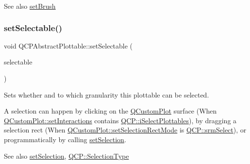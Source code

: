 \begin{DoxySeeAlso}{See also}
\hyperlink{class_q_c_p_abstract_plottable_a7a4b92144dca6453a1f0f210e27edc74}{set\+Brush} 
\end{DoxySeeAlso}
\mbox{\label{class_q_c_p_abstract_plottable_ac238d6e910f976f1f30d41c2bca44ac3}} 
\subsubsection{\texorpdfstring{set\+Selectable()}{setSelectable()}}
{\footnotesize\ttfamily void Q\+C\+P\+Abstract\+Plottable\+::set\+Selectable (\begin{DoxyParamCaption}\item[{\hyperlink{namespace_q_c_p_ac6cb9db26a564b27feda362a438db038}{Q\+C\+P\+::\+Selection\+Type}}]{selectable }\end{DoxyParamCaption})}

Sets whether and to which granularity this plottable can be selected.

A selection can happen by clicking on the \hyperlink{class_q_custom_plot}{Q\+Custom\+Plot} surface (When \hyperlink{class_q_custom_plot_a5ee1e2f6ae27419deca53e75907c27e5}{Q\+Custom\+Plot\+::set\+Interactions} contains \hyperlink{namespace_q_c_p_a2ad6bb6281c7c2d593d4277b44c2b037ab4ac8dbba56ed6ef7d1355895707d6a5}{Q\+C\+P\+::i\+Select\+Plottables}), by dragging a selection rect (When \hyperlink{class_q_custom_plot_a810ef958ebe84db661c7288b526c0deb}{Q\+Custom\+Plot\+::set\+Selection\+Rect\+Mode} is \hyperlink{namespace_q_c_p_ac9aa4d6d81ac76b094f9af9ad2d3aacfa590be33019df7ba5276a8457a5c769c1}{Q\+C\+P\+::srm\+Select}), or programmatically by calling \hyperlink{class_q_c_p_abstract_plottable_a219bc5403a9d85d3129165ec3f5ae436}{set\+Selection}.

\begin{DoxySeeAlso}{See also}
\hyperlink{class_q_c_p_abstract_plottable_a219bc5403a9d85d3129165ec3f5ae436}{set\+Selection}, \hyperlink{namespace_q_c_p_ac6cb9db26a564b27feda362a438db038}{Q\+C\+P\+::\+Selection\+Type} 
\end{DoxySeeAlso}
\mbox{\label{class_q_c_p_abstract_plottable_a219bc5403a9d85d3129165ec3f5ae436}} 
